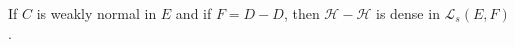 If $C$ is weakly normal in $E$ and if $F = D - D$, then $\mathcal{H} - \mathcal{H}$ is dense in $\mathcal{L}_s(E, F)$.
